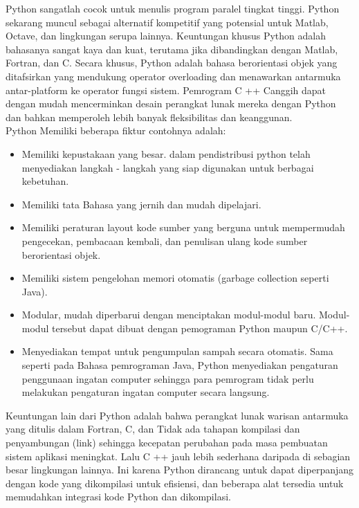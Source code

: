 \documentclass[12pt,a4paper]{article}
\begin{document}
Python sangatlah cocok untuk menulis program paralel tingkat tinggi. Python sekarang muncul sebagai alternatif kompetitif yang potensial untuk Matlab, Octave, dan lingkungan serupa lainnya. Keuntungan khusus Python adalah bahasanya sangat kaya dan kuat, terutama jika dibandingkan dengan Matlab, Fortran, dan C. Secara khusus, Python adalah bahasa berorientasi objek yang ditafsirkan yang mendukung operator overloading dan menawarkan antarmuka antar-platform ke operator fungsi sistem. Pemrogram C ++ Canggih dapat dengan mudah mencerminkan desain perangkat lunak mereka dengan Python dan bahkan memperoleh lebih banyak fleksibilitas dan keanggunan.\\


Python Memiliki beberapa fiktur contohnya adalah: 
\begin{itemize}

\item Memiliki kepustakaan yang besar. dalam pendistribusi python telah menyediakan langkah - langkah yang siap digunakan untuk berbagai kebetuhan. 

\item Memiliki tata Bahasa yang jernih dan mudah dipelajari. 

\item Memiliki peraturan layout kode sumber yang berguna untuk mempermudah pengecekan, pembacaan kembali, dan penulisan ulang kode sumber berorientasi objek. 

\item Memiliki sistem pengelohan memori otomatis (garbage collection seperti Java). 

\item Modular, mudah diperbarui dengan menciptakan modul-modul baru. Modul-modul tersebut dapat dibuat dengan pemograman Python maupun C/C++. 

\item Menyediakan tempat untuk pengumpulan sampah secara otomatis. Sama seperti pada Bahasa pemrograman Java, Python menyediakan pengaturan penggunaan ingatan computer sehingga para pemrogram tidak perlu melakukan pengaturan ingatan computer secara langsung.

\end{itemize}
Keuntungan lain dari Python adalah bahwa perangkat lunak warisan antarmuka yang ditulis dalam Fortran, C, dan Tidak ada tahapan kompilasi dan penyambungan (link) sehingga kecepatan perubahan pada masa pembuatan sistem aplikasi meningkat. Lalu C ++ jauh lebih sederhana daripada di sebagian besar lingkungan lainnya. Ini karena Python dirancang untuk dapat diperpanjang dengan kode yang dikompilasi untuk efisiensi, dan beberapa alat tersedia untuk memudahkan integrasi kode Python dan dikompilasi.
\end{document}
